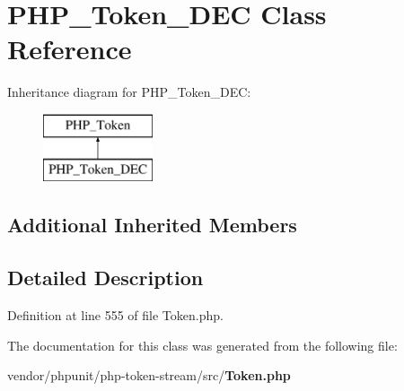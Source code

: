 \section{P\+H\+P\+\_\+\+Token\+\_\+\+D\+E\+C Class Reference}
\label{class_p_h_p___token___d_e_c}
Inheritance diagram for P\+H\+P\+\_\+\+Token\+\_\+\+D\+E\+C\+:\begin{figure}[H]
\begin{center}
\leavevmode
\includegraphics[height=2.000000cm]{class_p_h_p___token___d_e_c}
\end{center}
\end{figure}
\subsection*{Additional Inherited Members}


\subsection{Detailed Description}


Definition at line 555 of file Token.\+php.



The documentation for this class was generated from the following file\+:\begin{DoxyCompactItemize}
\item 
vendor/phpunit/php-\/token-\/stream/src/{\bf Token.\+php}\end{DoxyCompactItemize}
